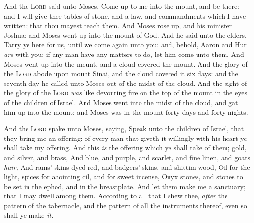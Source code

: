 \documentclass[11pt,letterpaper,oneside]{memoir}
\begin{document}
And the \textsc{Lord} said unto Moses, Come up to me into the mount, and
be there: and I will give thee tables of stone, and a law, and
commandments which I have written; that thou mayest teach them. And
Moses rose up, and his minister Joshua: and Moses went up into the mount
of God. And he said unto the elders, Tarry ye here for us, until we come
again unto you: and, behold, Aaron and Hur \emph{are} with you: if any
man have any matters to do, let him come unto them. And Moses went up
into the mount, and a cloud covered the mount. And the glory of the
\textsc{Lord} abode upon mount Sinai, and the cloud covered it six days:
and the seventh day he called unto Moses out of the midst of the cloud.
And the sight of the glory of the \textsc{Lord} \emph{was} like
devouring fire on the top of the mount in the eyes of the children of
Israel. And Moses went into the midst of the cloud, and gat him up into
the mount: and Moses was in the mount forty days and forty nights.

And the \textsc{Lord} spake unto Moses, saying, Speak unto the children
of Israel, that they bring me an offering: of every man that giveth it
willingly with his heart ye shall take my offering. And this \emph{is}
the offering which ye shall take of them; gold, and silver, and brass,
And blue, and purple, and scarlet, and fine linen, and goats \emph{hair,
}And rams' skins dyed red, and badgers' skins, and shittim wood, Oil for
the light, spices for anointing oil, and for sweet incense, Onyx stones,
and stones to be set in the ephod, and in the breastplate. And let them
make me a sanctuary; that I may dwell among them. According to all that
I shew thee, \emph{after} the pattern of the tabernacle, and the pattern
of all the instruments thereof, even so shall ye make \emph{it.}
\end{document}
